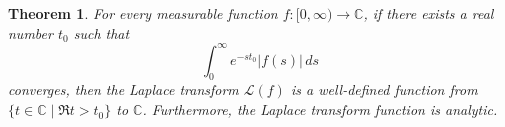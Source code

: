 \documentclass[12pt]{article}
\newtheorem{theorem}{Theorem}
\begin{document}
\begin{theorem}
For every measurable function $f \colon [0,\infty) \to \mathbb{C}$, if there exists a real number $t_0$ such that
 \[ \int_0^\infty e^{-st_0} |f(s)| \, ds \]
converges, then the Laplace transform $\mathcal{L}(f)$ is
a well-defined function from $\{t \in \mathbb{C} \mid \Re t > t_0 \}$ to 
$\mathbb{C}$.  Furthermore, the Laplace transform function is analytic.
\end{theorem}
\end{document}
